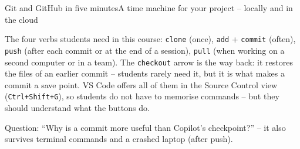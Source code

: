 \documentclass[aspectratio=169,11pt]{beamer}
\begin{document}
\begin{frame}{Git and GitHub in five minutes}{A time machine for your project -- locally and in the cloud}
{  The four verbs students need in this course: \texttt{clone} (once), \texttt{add} + \texttt{commit} (often), \texttt{push} (after each commit or at the end of a session), \texttt{pull} (when working on a second computer or in a team). The \texttt{checkout} arrow is the way back: it restores the files of an earlier commit -- students rarely need it, but it is what makes a commit a save point. VS Code offers all of them in the Source Control view (\texttt{Ctrl+Shift+G}), so students do not have to memorise commands -- but they should understand what the buttons do.\par
  Question: ``Why is a commit more useful than Copilot's checkpoint?'' -- it also survives terminal commands and a crashed laptop (after push).}
\end{frame}

\end{document}
